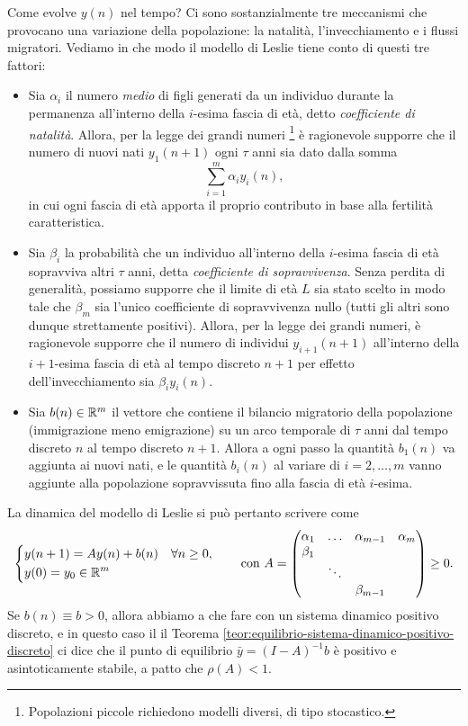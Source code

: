Come evolve $y(n)$ nel tempo?
Ci sono sostanzialmente tre meccanismi che provocano una variazione della
popolazione: la natalità, l'invecchiamento e i flussi migratori.
Vediamo in che modo il modello di Leslie tiene conto di questi tre fattori:
\begin{itemize}
\item Sia $\alpha_i$ il numero \emph{medio} di figli generati da un individuo
	durante la permanenza all'interno della $i$-esima fascia di età, detto
	\emph{coefficiente di natalità}. Allora, per la legge dei grandi numeri%
	\footnote{Popolazioni piccole richiedono modelli diversi, di tipo stocastico.}
	è ragionevole supporre che il numero di nuovi nati $y_1(n+1)$ ogni $\tau$ anni
	sia dato dalla somma
	\[
	\sum	_{i=1}^m \alpha_i y_i(n),
	\]
	in cui ogni fascia di età apporta il proprio contributo in base alla
	fertilità caratteristica.
\item Sia $\beta_i$ la probabilità che un individuo all'interno della $i$-esima
	fascia di età sopravviva altri $\tau$ anni, detta \emph{coefficiente di sopravvivenza}.
	Senza perdita di generalità, possiamo supporre che il limite di età $L$
	sia stato scelto in modo tale che $\beta_m$ sia l'unico coefficiente di sopravvivenza
	nullo (tutti gli altri sono dunque strettamente positivi).
	Allora, per la legge dei grandi numeri, è ragionevole supporre che il numero
	di individui $y_{i+1}(n+1)$ all'interno della $i\!+\!1$-esima fascia di età
	al tempo discreto $n+1$ per effetto dell'invecchiamento sia $\beta_i y_i(n)$.
\item Sia $b(n) \in \mathbb{R}^m$ il vettore che contiene il bilancio migratorio
	della popolazione (immigrazione meno emigrazione) su un arco temporale
	di $\tau$ anni dal tempo discreto $n$ al tempo discreto $n+1$.
	Allora a ogni passo la quantità $b_1(n)$ va aggiunta ai nuovi nati,
	e le quantità $b_i(n)$ al variare di $i = 2,\dots,m$ vanno aggiunte alla
	popolazione sopravvissuta fino alla fascia di età $i$-esima.
\end{itemize}
La dinamica del modello di Leslie si può pertanto scrivere come
\begin{equation} \label{eq:problema-leslie}
\left\{
\begin{aligned}
& y(n+1) = A y(n) + b(n) \quad \forall n \geq 0, \\
& y(0) = y_0 \in \mathbb{R}^m
\end{aligned}
\right.
\qquad \text{con }
A =
\begin{pmatrix}
\alpha_1 & \dots  & \alpha_{m-1} & \alpha_m \\ 
\beta_1  &        &              &          \\ 
         & \ddots &              &          \\ 
         &        & \beta_{m-1}  &
\end{pmatrix}
\geq 0.
\end{equation}
Se $b(n) \equiv b > 0$, allora abbiamo a che fare con un sistema dinamico
positivo discreto, e in questo caso il il Teorema
\ref{teor:equilibrio-sistema-dinamico-positivo-discreto} ci dice
che il punto di equilibrio $\bar{y} = (I-A)^{-1}b$ è positivo e asintoticamente
stabile, a patto che $\rho(A) < 1$.


